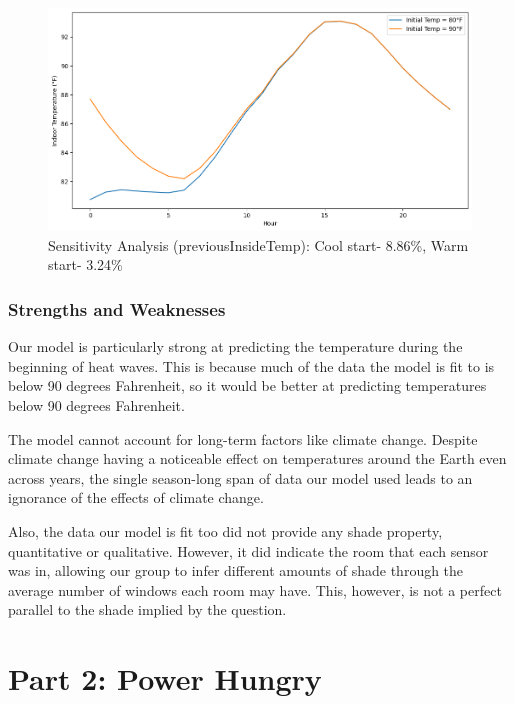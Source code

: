 \documentclass[12pt]{article}
\begin{document}
\begin{figure}
    \centering
    \includegraphics[scale=0.55]{previousinsideTemp.png}
    \caption{Sensitivity Analysis (previousInsideTemp): Cool start- 8.86\%, Warm start- 3.24\%}  
    \label{fig:sensitivityInside}
\end{figure}


\subsubsection{Strengths and Weaknesses}
\par Our model is particularly strong at predicting the temperature during the beginning of heat waves. This is because much of the data the model is fit to is below 90 degrees Fahrenheit, so it would be better at predicting temperatures below 90 degrees Fahrenheit.
\par The model cannot account for long-term factors like climate change. Despite climate change having a noticeable effect on temperatures around the Earth even across years, the single season-long span of data our model used leads to an ignorance of the effects of climate change.\cite{https://www.journals.sagepub.com/doi/pdf/10.1177/0143624419847621} 
\par Also, the data our model is fit too did not provide any shade property, quantitative or qualitative. However, it did indicate the room that each sensor was in, allowing our group to infer different amounts of shade through the average number of windows each room may have. This, however, is not a perfect parallel to the shade implied by the question.

\pagebreak
\section{Part 2: Power Hungry}
\end{document}
